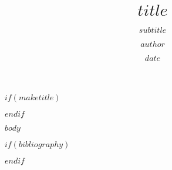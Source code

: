 \documentclass[11pt,a4paper]{scrartcl}
\title{$title$}
\author{$author$}
\subtitle{$subtitle$}
\date{$date$}
\begin{document}
	
	$if(maketitle)$
	\maketitle
	$endif$
	
	$body$
	
	$if(bibliography)$
		
		
	$endif$
\end{document}
